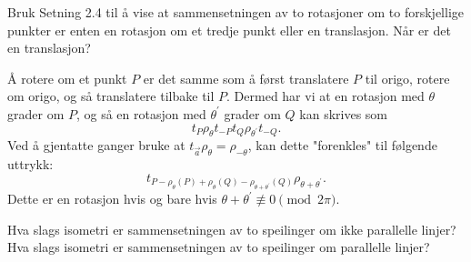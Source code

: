 \documentclass[11pt, norsk]{article}
\begin{document}
\begin{oppg}
Bruk Setning 2.4 til å vise at sammensetningen av to rotasjoner om to forskjellige punkter er enten en rotasjon om et tredje punkt eller en translasjon. Når er det en translasjon?  
\end{oppg}
\begin{losn}
Å rotere om et punkt $P$ er det samme som å først translatere $P$ til origo, rotere om origo, og så translatere tilbake til $P$. Dermed har vi at en rotasjon med $\theta$ grader om $P$, og så en rotasjon med $\theta^\prime$ grader om $Q$ kan skrives som
$$
t_P \rho_\theta t_{-P} t_Q \rho_{\theta^\prime} t_{-Q}.
$$
Ved å  gjentatte ganger bruke at $t_{\vec a} \rho_{\theta} = \rho_{-\theta}$, kan dette "forenkles" til følgende uttrykk: 
$$
t_{P-\rho_\theta(P)+\rho_\theta(Q)-\rho_{\theta+\theta^\prime}(Q)} \rho_{\theta+\theta^\prime}.
$$
Dette er en rotasjon hvis og bare hvis $\theta+\theta^\prime \not \equiv 0 \pmod {2\pi}$.
\end{losn}


\begin{oppg}
Hva slags isometri er sammensetningen av to speilinger om ikke parallelle linjer? Hva slags isometri er sammensetningen av to speilinger om parallelle linjer?
\end{oppg}
\end{document}

